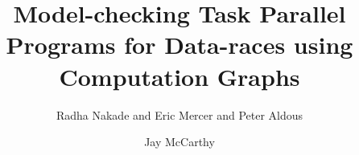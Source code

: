 \documentclass[sigplan,10pt,review,anonymous,table]{acmart}\settopmatter{printfolios=true,printccs=false,printacmref=false}
\begin{document}

\title[Model-checking Task Parallel Programs]{Model-checking Task Parallel Programs for Data-races using Computation Graphs}





\author{Radha Nakade and Eric Mercer and Peter Aldous}
\orcid{}

\author{Jay McCarthy}

\renewcommand{\shortauthors}{R. Nakade, E. Mercer, P. Aldous, and J. McCarthy}



\begin{abstract}

\end{abstract}
\end{document}
